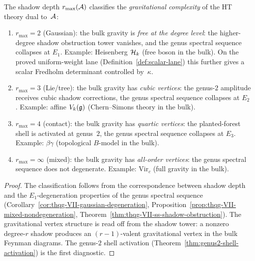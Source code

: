 \begin{theorem}
\label{thm:thqg-VII-depth-classification}
The shadow depth $r_{\max}(\mathcal{A})$ classifies the
\emph{gravitational complexity} of the HT theory dual to~$\mathcal{A}$:
\begin{enumerate}[label=\textup{(\roman*)}]
\item $r_{\max} = 2$ \textup{(}Gaussian\textup{)}: the bulk
 gravity is \emph{free at the degree level}: the higher-degree
 shadow obstruction tower vanishes, and the genus
 spectral sequence collapses at $E_1$. Example: Heisenberg
 $\mathcal{H}_k$ (free boson in the bulk). On the proved uniform-weight lane
 (Definition~\ref{def:scalar-lane}) this further gives a scalar
 Fredholm determinant controlled by~$\kappa$.
\item $r_{\max} = 3$ \textup{(}Lie/tree\textup{)}: the bulk
 gravity has \emph{cubic vertices}: the genus-$2$ amplitude
 receives cubic shadow corrections, the genus spectral
 sequence collapses at $E_2$. Example: affine $V_k(\mathfrak{g})$
 (Chern--Simons theory in the bulk).
\item $r_{\max} = 4$ \textup{(}contact\textup{)}: the bulk
 gravity has \emph{quartic vertices}: the planted-forest
 shell is activated at genus~$2$, the genus spectral
 sequence collapses at $E_3$. Example: $\beta\gamma$
 (topological $B$-model in the bulk).
\item $r_{\max} = \infty$ \textup{(}mixed\textup{)}: the bulk
 gravity has \emph{all-order vertices}: the genus
 spectral sequence does not degenerate. Example:
 $\mathrm{Vir}_c$ (full gravity in the bulk).
\end{enumerate}
\end{theorem}

\begin{proof}
The classification follows from the correspondence between
shadow depth and the $E_1$-degeneration properties of the genus
spectral sequence
(Corollary~\ref{cor:thqg-VII-gaussian-degeneration},
Proposition~\ref{prop:thqg-VII-mixed-nondegeneration},
Theorem~\ref{thm:thqg-VII-ss-shadow-obstruction}).
The gravitational vertex structure is read off from the shadow
tower: a nonzero degree-$r$ shadow produces an $(r{-}1)$-valent
gravitational vertex in the bulk Feynman diagrams. The
genus-$2$ shell activation
(Theorem~\ref{thm:genus2-shell-activation})
is the first diagnostic.
\end{proof}


